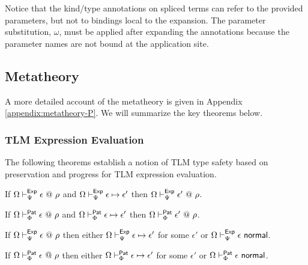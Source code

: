 Notice that the kind/type annotations on spliced terms can refer to the provided parameters, but not to bindings local to the expansion. The parameter substitution, $\omega$, must be applied after expanding the annotations because the parameter names are not bound at the application site.

\subsection{Metatheory}
A more detailed account of the metatheory is given in Appendix \ref{appendix:metatheory-P}. We will summarize the key theorems below.

\subsubsection{TLM Expression Evaluation}
The following theorems establish a notion of TLM type safety based on preservation and progress for TLM expression evaluation.

\begingroup
\def\thetheorem{\ref{thm:peTLM-preservation}}
\begin{theorem}
If $\Omega \vdash_{\Psi}^{\mathsf{Exp}} \epsilon ~@~ \rho$ and $\Omega \vdash_{\Psi}^\mathsf{Exp} \epsilon \mapsto \epsilon'$ then $\Omega \vdash_{\Psi}^{\mathsf{Exp}} \epsilon' ~@~ \rho$.
\end{theorem}
\endgroup

\begingroup
\def\thetheorem{\ref{thm:ppTLM-preservation}}
\begin{theorem}
If $\Omega \vdash_{\Phi}^{\mathsf{Pat}} \epsilon ~@~ \rho$ and $\Omega \vdash_{\Phi}^\mathsf{Pat} \epsilon \mapsto \epsilon'$ then $\Omega \vdash_{\Phi}^{\mathsf{Pat}} \epsilon' ~@~ \rho$.
\end{theorem}
\endgroup

\begingroup
\def\thetheorem{\ref{thm:peTLM-progress}}
\begin{theorem}
If $\Omega \vdash_{\Psi}^{\mathsf{Exp}} \epsilon ~@~ \rho$ then either $\Omega \vdash_{\Psi}^\mathsf{Exp} \epsilon \mapsto \epsilon'$ for some $\epsilon'$ or $\Omega \vdash_{\Psi}^\mathsf{Exp} \epsilon~\mathsf{normal}$.
\end{theorem}
\endgroup

\begingroup
\def\thetheorem{\ref{thm:ppTLM-progress}}
\begin{theorem}
If $\Omega \vdash_{\Phi}^{\mathsf{Pat}} \epsilon ~@~ \rho$ then either $\Omega \vdash_{\Phi}^\mathsf{Pat} \epsilon \mapsto \epsilon'$ for some $\epsilon'$ or $\Omega \vdash_{\Phi}^\mathsf{Pat} \epsilon~\mathsf{normal}$.
\end{theorem}
\endgroup

